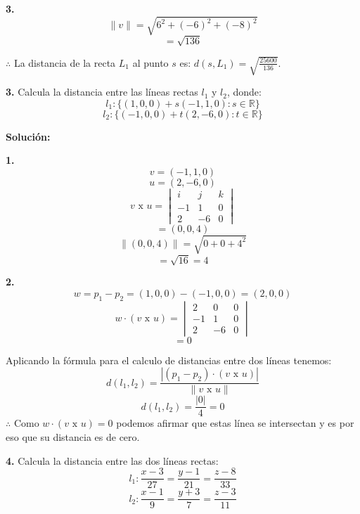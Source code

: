 \documentclass{article}
\begin{document}
\begin{minipage}[c]{0.5cm}
    \textbf{3.}
    $$\|v\| = \sqrt{6^2+ (-6)^2+ (-8)^2}$$
    $$=\sqrt{136}$$
\end{minipage}

$\therefore$ La distancia de la recta $L_1$ al punto $s$ es: $d(s,L_1) = \sqrt{\frac{25600}{136}}$.
\vspace{10pt}

\textbf{3.} Calcula la distancia entre las líneas rectas $l_1$ y $l_2$, donde:
$$l_1: \{(1,0,0)+ s (-1, 1, 0): s \in \mathbb{R}\}$$
$$l_2 : \{(-1,0,0)+t(2,-6,0): t \in \mathbb{R}\}$$
\vspace{10pt}

\textbf{Solución:}
\vspace{10pt}

\begin{minipage}[c]{0.5cm}
    \textbf{1.}
    $$v = (-1, 1, 0)$$
    $$u = (2,-6,0)$$
    $$v \text{ x } u = \begin{vmatrix}
        i & j & k \\
        -1 & 1 & 0\\
        2 & -6 & 0
    \end{vmatrix}$$
    $$=(0, 0, 4)$$ 
    $$\|(0,0,4)\| = \sqrt{0+0+4^2}$$
    $$= \sqrt{16} = 4$$
\end{minipage}\hspace*{7cm}\begin{minipage}[c]{0.5cm}
    \textbf{2.}
    $$w = p_1-p_2 = (1,0,0)-(-1,0,0) =(2,0,0)$$
    $$w \cdot (v \text{ x } u) = \begin{vmatrix}
        2 & 0 & 0 \\
        -1 & 1 & 0\\
        2 & -6 & 0
    \end{vmatrix}$$
    $$=0$$
\end{minipage}
\vspace{10pt}

Aplicando la fórmula para el calculo de distancias entre dos líneas tenemos:
$$d(l_1,l_2) = \frac{\left|(p_1-p_2) \cdot(v \text{ x } u)\right|}{\|v \text{ x } u\|}$$
$$d(l_1,l_2) = \frac{\left|0\right|}{4} = 0$$
$\therefore$ Como $w \cdot (v \text{ x } u) = 0$  podemos afirmar que estas línea se intersectan y es por eso que su distancia es de cero.
\vspace{10pt}

\textbf{4.} Calcula la distancia entre las dos líneas rectas:
$$l_1: \frac{x-3}{27}= \frac{y-1}{21} = \frac{z-8}{33}$$
$$l_2: \frac{x-1}{9} =\frac{y+3}{7} = \frac{z-3}{11}$$
\vspace{10pt}
\end{document}
